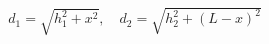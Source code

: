 \documentclass[preview]{standalone}
\begin{document}
\begin{align*}
d_1 = \sqrt{h_1^2 + x^2}, \quad d_2 = \sqrt{h_2^2 + (L-x)^2}
\end{align*}
\end{document}
